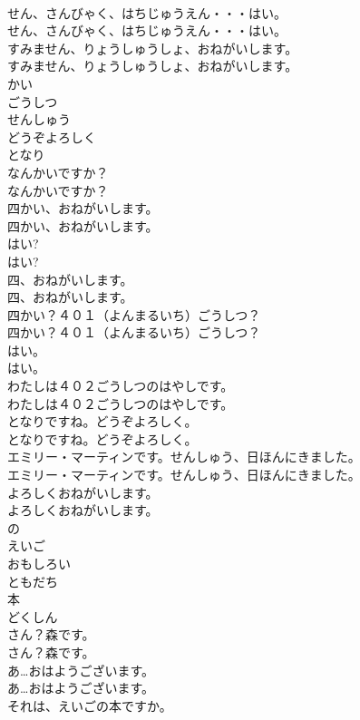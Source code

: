 \documentclass[8pt]{extreport}
\begin{document}
\begin{CJK}{UTF8}{min}
\\	せん、さんびゃく、はちじゅうえん・・・はい。	
\\	せん、さんびゃく、はちじゅうえん・・・はい。 
\\	すみません、りょうしゅうしょ、おねがいします。	
\\	すみません、りょうしゅうしょ、おねがいします。 
\\	かい
\\	ごうしつ
\\	せんしゅう
\\	どうぞよろしく
\\	となり
\\	なんかいですか？	
\\	なんかいですか？ 
\\	四かい、おねがいします。	
\\	四かい、おねがいします。 
\\	はい?	
\\	はい? 
\\	四、おねがいします。	
\\	四、おねがいします。 
\\	四かい？４０１（よんまるいち）ごうしつ？	
\\	四かい？４０１（よんまるいち）ごうしつ？ 
\\	はい。	
\\	はい。 
\\	わたしは４０２ごうしつのはやしです。	
\\	わたしは４０２ごうしつのはやしです。 
\\	となりですね。どうぞよろしく。	
\\	となりですね。どうぞよろしく。 
\\	エミリー・マーティンです。せんしゅう、日ほんにきました。	
\\	エミリー・マーティンです。せんしゅう、日ほんにきました。 
\\	よろしくおねがいします。	
\\	よろしくおねがいします。 
\\	の
\\	えいご
\\	おもしろい
\\	ともだち
\\	本
\\	どくしん
\\	さん？森です。	
\\	さん？森です。 
\\	あ…おはようございます。	
\\	あ…おはようございます。 
\\	それは、えいごの本ですか。	

\end{CJK}
\end{document}
